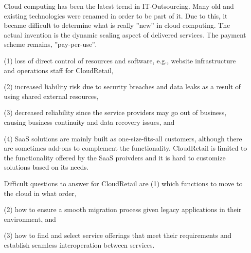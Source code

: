 Cloud computing has been the latest trend in IT-Outsourcing. Many old and existing technologies were renamed in order to be part of it. Due to this, it became difficult to determine what is really ''new'' in cloud computing. The actual invention is the dynamic scaling aspect of delivered services. The payment scheme remains, ''pay-per-use''. \cite{Boehm2011}


(1) loss of direct control of resources and software, e.g., website infrastructure and operations staff for CloudRetail, 

(2) increased liability risk due to security breaches and data leaks as a result of using shared external resources, 

(3) decreased reliability since the service providers may go out of business, causing business continuity and data recovery issues, and 

(4) SaaS solutions are mainly built as one-size-fits-all customers, although there are sometimes add-ons to complement the functionality. CloudRetail is limited to the functionality offered by the SaaS proivders and it is hard to customize solutions based on its needs.



Difficult questions to answer for CloudRetail are 
(1) which functions to move to the cloud in what order, 

(2) how to ensure a smooth migration process given legacy applications in their environment, and 

(3) how to find and select service offerings that meet their requirements and establish seamless interoperation between services.